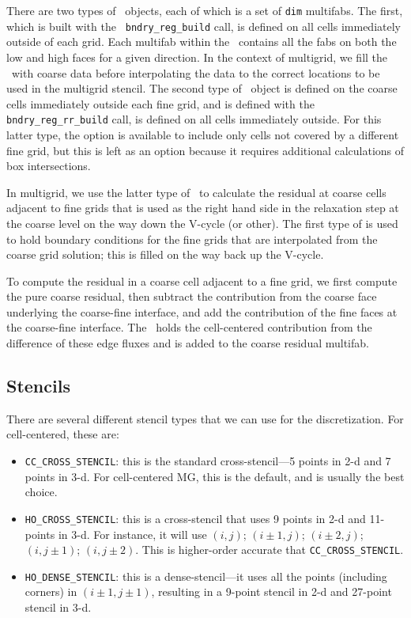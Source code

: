There are two types of \bndryreg\ objects, each of which is a set of
{\tt dim} multifabs.  The first, which is built with the {\tt
bndry\_reg\_build} call, is defined on all cells immediately outside
of each grid.  Each multifab within the \bndryreg\ contains all the
fabs on both the low and high faces for a given direction.  In the
context of multigrid, we fill the \bndryreg\ with coarse data before
interpolating the data to the correct locations to be used in the
multigrid stencil.  The second type of \bndryreg\ object is defined on
the coarse cells immediately outside each fine grid, and is defined
with the {\tt bndry\_reg\_rr\_build} call, is defined on all cells
immediately outside.  For this latter type, the option is available
to include only cells not covered by a different fine grid, but this
is left as an option because it requires additional calculations of
box intersections.

In multigrid, we use the latter type of \bndryreg\ to calculate the
residual at coarse cells adjacent to fine grids that is used as the
right hand side in the relaxation step at the coarse level on the way
down the V-cycle (or other).  The first type of \bndryreg is used to
hold boundary conditions for the fine grids that are interpolated from
the coarse grid solution; this is filled on the way back up the
V-cycle.

To compute the residual in a coarse cell adjacent to a fine grid, we
first compute the pure coarse residual, then subtract the contribution
from the coarse face underlying the coarse-fine interface, and add the
contribution of the fine faces at the coarse-fine interface.
The \bndryreg\ holds the cell-centered contribution from the
difference of these edge fluxes and is added to the coarse residual
multifab.



\subsection{Stencils}

There are several different stencil types that we can use for 
the discretization.  For cell-centered, these are:
\begin{itemize}
\item {\tt CC\_CROSS\_STENCIL}: this is the standard cross-stencil---5 points 
in 2-d and 7 points in 3-d.  For cell-centered MG, this is the default, and
is usually the best choice.

\item {\tt HO\_CROSS\_STENCIL}: this is a cross-stencil that uses 9 points
in 2-d and 11-points in 3-d.  For instance, it will use $(i,j)$;
$(i\pm1,j)$; $(i\pm2,j)$; $(i,j\pm1)$; $(i,j\pm2)$.  This is
higher-order accurate that {\tt CC\_CROSS\_STENCIL}.

\item {\tt HO\_DENSE\_STENCIL}: this is a dense-stencil---it uses all the
points (including corners) in $(i\pm1,j\pm1)$, resulting in a 9-point stencil
in 2-d and 27-point stencil in 3-d.
\end{itemize}

